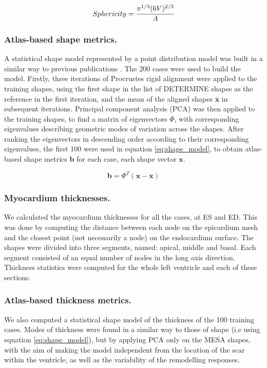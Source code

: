 \documentclass{llncs}
\begin{document}
\begin{equation} \label{eq:sphericity}
 Sphericity = \cfrac{\pi^{1/3}(6V)^{2/3}}{A} 
\end{equation}

\subsubsection{Atlas-based shape metrics.} 

A statistical shape model represented by a point distribution model was built in a similar way to previous publications \cite{VanAssen2006,Lotjonen2004}. The 200 cases were used to build the model. Firstly, three iterations of Procrustes rigid alignment were applied to the training shapes, using the first shape in the list of DETERMINE shapes as the reference in the first iteration, and the mean of the aligned shapes $\bar{\textbf{x}} $ in subsequent iterations. Principal component analysis (PCA) was then applied to the training shapes, to find a matrix of eigenvectors $\Phi$, with corresponding eigenvalues describing geometric modes of variation across the shapes. After ranking the eigenvectors in descending order according to their corresponding eigenvalues, the first 100 were used in equation \ref{eq:shape_model}, to obtain atlas-based shape metrics $\textbf{b} $ for each case, each shape vector $ \textbf{x} $. 


\begin{equation} \label{eq:shape_model}
\textbf{b} = \Phi^T(\textbf{x} - \bar{\textbf{x}} )
\end{equation}

\subsubsection{Myocardium thicknesses.}
We calculated the myocardium thicknesses for all the cases, at ES and ED. This was done by computing the distance between each node on the epicardium mesh and the closest point (not necessarily a node) on the endocardium surface. The shapes were divided into three segments, named: apical, middle and basal. Each segment consisted of an equal number of nodes in the long axis direction. Thickness statistics were computed for the whole left ventricle and each of these sections.
\subsubsection{Atlas-based thickness metrics.} 

We also computed a statistical shape model of the thickness of the 100 training cases. Modes of thickness were found in a similar way to those of shape (i.e using equation \ref{eq:shape_model}), but by applying PCA only on the MESA shapes, with the aim of making the model independent from the location of the scar within the ventricle, as well as the variability of the remodelling responses.
\end{document}
